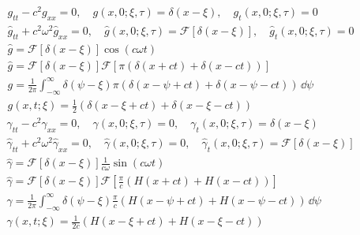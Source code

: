 {\begin{Solution}
  \begin{gather*}
    g_{t t} - c^2 g_{x x} = 0, \quad
    g(x,0;\xi,\tau) = \delta(x - \xi), \quad 
    g_t(x,0;\xi,\tau) = 0 \\
    \hat{g}_{t t} + c^2 \omega^2 \hat{g}_{x x} = 0, \quad
    \hat{g}(x,0;\xi,\tau) = \mathcal{F}[\delta(x - \xi)], \quad 
    \hat{g}_t(x,0;\xi,\tau) = 0 \\
    \hat{g} = \mathcal{F}[\delta(x - \xi)] \cos(c \omega t) \\
    \hat{g} = \mathcal{F}[\delta(x - \xi)] 
    \mathcal{F}[\pi ( \delta(x + c t) + \delta(x - c t) ) ] \\
    g = \frac{1}{2\pi} \int_{-\infty}^\infty \delta(\psi - \xi) 
    \pi ( \delta(x - \psi + c t) + \delta(x - \psi - c t) ) \,\dd \psi \\
    \boxed{
      g(x,t; \xi) = \frac{1}{2} ( \delta(x - \xi + c t) 
      + \delta(x - \xi - c t) )
      }
  \end{gather*}
  \begin{gather*}
    \gamma_{t t} - c^2 \gamma_{x x} = 0, \quad
    \gamma(x,0;\xi,\tau) = 0, \quad 
    \gamma_t(x,0;\xi,\tau) = \delta(x - \xi) \\
    \hat{\gamma}_{t t} + c^2 \omega^2 \hat{\gamma}_{x x} = 0, \quad
    \hat{\gamma}(x,0;\xi,\tau) = 0, \quad 
    \hat{\gamma}_t(x,0;\xi,\tau) = \mathcal{F}[\delta(x - \xi)] \\
    \hat{\gamma} = \mathcal{F}[\delta(x - \xi)] 
    \frac{1}{c \omega} \sin(c \omega t) \\
    \hat{\gamma} = \mathcal{F}[\delta(x - \xi)] 
    \mathcal{F}\left[ \frac{\pi}{c} ( H(x + c t) + H(x - c t) ) \right] \\
    \gamma = \frac{1}{2\pi} \int_{-\infty}^\infty \delta(\psi - \xi) 
    \frac{\pi}{c} ( H(x - \psi + c t) + H(x - \psi - c t) ) \,\dd \psi \\
    \boxed{
      \gamma(x,t; \xi) = \frac{1}{2 c} ( H(x - \xi + c t) + H(x - \xi - c t) )
      }
  \end{gather*}
\end{Solution}





}

